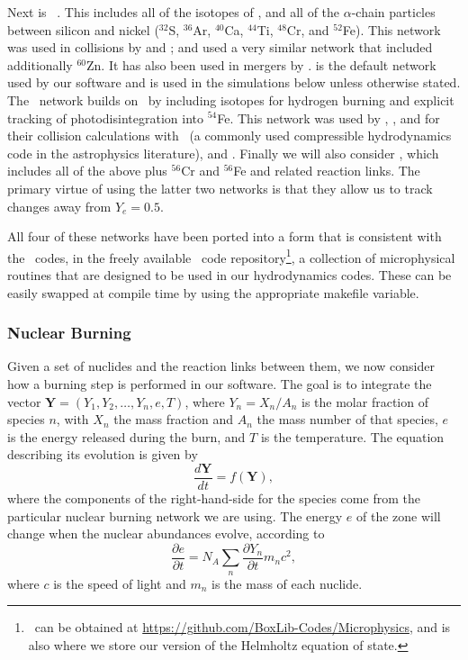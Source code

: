 \documentclass[12pt]{article}
\begin{document}
Next is \aproxthirteen\ \citep{timmes:1999,timmes:2000}. This includes
all of the isotopes of \isoseven, and all of the $\alpha$-chain particles between
silicon and nickel (${}^{32}$S, ${}^{36}$Ar, ${}^{40}$Ca, ${}^{44}$Ti, ${}^{48}$Cr,
and ${}^{52}$Fe). This network was used in collisions by \citet{hawley:2012} and
\citet{raskin:2010}; \citet{loren-aguilar:2010} and \citet{garcia-senz:2013} used a
very similar network that included additionally ${}^{60}$Zn. It has also been used in mergers
by \citet{raskin:2012,raskin:2014}. \aproxthirteen is the default network used by our
software and is used in the simulations below unless otherwise stated. The \aproxnineteen\
network \citep{timmes:1999} builds on \aproxthirteen\ by including isotopes for
hydrogen burning and explicit tracking of photodisintegration into ${}^{54}$Fe.
This network was used by \citet{kushnir:2013}, \citet{kushnir:2014}, and \citet{rosswog:2009}
for their collision calculations with \flash\ (a commonly used compressible hydrodynamics code
in the astrophysics literature), and \citet{papish:2015}. Finally we will also
consider \aproxtwentyone, which includes all of the above plus ${}^{56}$Cr
and ${}^{56}$Fe and related reaction links. The primary virtue of using
the latter two networks is that they allow us to track changes away from
$Y_e = 0.5$.

All four of these networks have been ported into a form that is consistent
with the \boxlib\ codes, in the freely available \microphysics\ code
repository\footnote{\microphysics\ can be obtained at \url{https://github.com/BoxLib-Codes/Microphysics},
and is also where we store our version of the Helmholtz equation of state.},
a collection of microphysical routines that are designed to be used in our
hydrodynamics codes. These can be easily swapped at compile time by using the 
appropriate makefile variable.



\subsubsection{Nuclear Burning}
\label{sec:burning}

Given a set of nuclides and the reaction links between them, we now consider
how a burning step is performed in our software. The goal is to integrate the
vector ${\bm{Y}} = (Y_1, Y_2, \ldots, Y_n, e, T)$, where $Y_{n} = X_{n} / A_{n}$
is the molar fraction of species $n$, with $X_n$ the mass fraction and $A_n$ the
mass number of that species, $e$ is the energy released during the burn, and
$T$ is the temperature. The equation describing its evolution is given by
\begin{equation}
  \frac{d\bm{Y}}{dt} = f(\mathbf{Y}),
\end{equation}
where the components of the right-hand-side for the species come from the particular
nuclear burning network we are using. The energy $e$ of the zone
will change when the nuclear abundances evolve, according to
\begin{equation}
  \frac{\partial e}{\partial t} = N_A \sum_{n} \frac{\partial Y_{n}}{\partial t} m_{n} c^2,
\end{equation}
where $c$ is the speed of light and $m_n$ is the mass of each nuclide.
\end{document}
